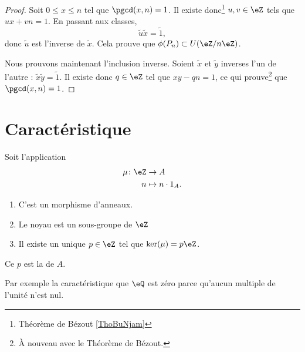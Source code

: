 \begin{proof}
    Soit \( 0\leq x\leq n\) tel que \( \pgcd(x,n)=1\). Il existe donc\footnote{Théorème de Bézout \ref{ThoBuNjam}} \( u,v\in\eZ\) tels que \( ux+vn=1\). En passant aux classes,
    \begin{equation}
        \tilde u\tilde x=\tilde 1,
    \end{equation}
    donc \( \tilde u\) est l'inverse de \( \tilde x\). Cela prouve que \( \phi(P_n)\subset U(\eZ/n\eZ)\).

    Nous prouvons maintenant l'inclusion inverse. Soient \( \tilde x\) et \( \tilde y\) inverses l'un de l'autre : $\tilde x\tilde y=\tilde 1$. Il existe donc \( q\in\eZ\) tel que \( xy-qn=1\), ce qui prouve\footnote{À nouveau avec le Théorème de Bézout.} que \( \pgcd(x,n)=1\).
\end{proof}

\section{Caractéristique}

\begin{lemmaDef}        \label{LEMDEFooVEWZooUrPaDw}
    Soit l'application
    \begin{equation}
        \begin{aligned}
            \mu\colon \eZ&\to A \\
            n&\mapsto n\cdot 1_A .
        \end{aligned}
    \end{equation}
    \begin{enumerate}
        \item
            C'est un morphisme d'anneaux.
        \item
            Le noyau est un sous-groupe de \( \eZ\)
        \item
            Il existe un unique \( p\in \eZ\) tel que \( \ker(\mu)=p\eZ\).
    \end{enumerate}
    Ce \( p\) est la  de \( A\).
\end{lemmaDef}

Par exemple la caractéristique que \( \eQ\) est zéro parce qu'aucun multiple de l'unité n'est nul.


